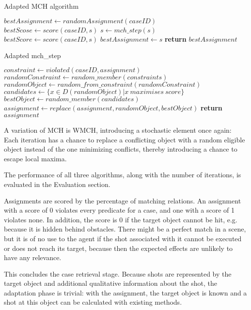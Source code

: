 \begin{algorithm}
    \caption{Adapted MCH algorithm}\label{algo:mch}
    \begin{algorithmic}[1]
        \State $bestAssignment\gets randomAssignment(caseID)$
        \State $bestScose \gets score(caseID, s)$
        \State $s\gets mch\_step(s)$
        \State $bestScore\gets score(caseID, s)$
        \State $bestAssignment\gets s$
        \EndIf
        \EndWhile
        \State \textbf{return} $bestAssignment$
        \EndProcedure
    \end{algorithmic}
\end{algorithm}


\begin{algorithm}
    \caption{Adapted mch\_step}\label{algo:mch_step}
    \begin{algorithmic}[1]
        \State $constraint \gets violated(caseID, assignment)$
        \State $randomConstraint\gets random\_member(constraints)$
        \State $randomObject \gets random\_from\_constraint(randomConstraint)$
        \State $candidates \gets \{x \in D(randomObject) \vert x\ maximises\ score\}$
        \State $bestObject \gets random\_member(candidates)$
        \State $assignment \gets replace(assignment, randomObject, bestObject)$
        \State \textbf{return} $assignment$
        \EndProcedure
    \end{algorithmic}
\end{algorithm}

A variation of \ac{MCH} is \ac{WMCH}, introducing a stochastic element once again: Each iteration has a chance to replace a conflicting object with a random eligible object instead of the one minimizing conflicts, thereby introducing a chance to escape local maxima.\cite{KapKis}

The performance of all three algorithms, along with the number of iterations, is evaluated in the Evaluation section.

Assignments are scored by the percentage of matching relations. An assignment with a score of 0 violates every predicate for a case, and one with a score of 1 violates none. In addition, the score is 0 if the target object cannot be hit, e.g. because it is hidden behind obstacles.
There might be a perfect match in a scene, but it is of no use to the agent if the shot associated with it cannot be executed or does not reach its target, because then the expected effects are unlikely to have any relevance.

This concludes the case retrieval stage. 
Because shots are represented by the target object and additional qualitative information about the shot, the adaptation phase is trivial: with the assignment, the target object is known and a shot at this object can be calculated with existing methods.